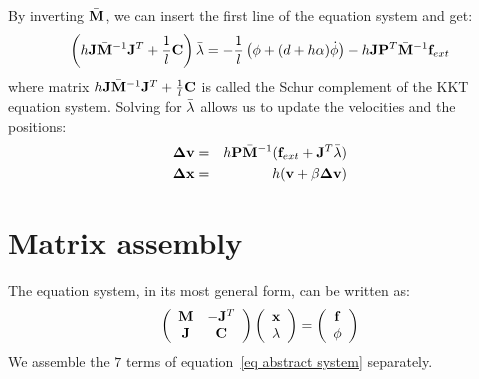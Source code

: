 
By inverting $\bar{\mathbf{M}}$, we can insert the first line of the equation system and get:
\begin{equation} \label{eq schur complement}
 \left( h\mathbf{J}\bar{\mathbf{M}}^{-1}\mathbf{J}^T + \frac{1}{l}\mathbf{C} \right) \bar{\mathbf{\lambda}} = -\frac{1}{l} \left(\phi + (d+h\alpha)\dot {\phi} \right) - h\mathbf{J} \mathbf{P}^T \bar{\mathbf{M}}^{-1} \mathbf{f}_{ext}
\end{equation}
where matrix $ h\mathbf{J}\bar{\mathbf{M}}^{-1}\mathbf{J}^T + \frac{1}{l}\mathbf{C} $ is called the Schur complement of the KKT equation system.
Solving for $\bar{\mathbf{\lambda}}$ allows us to update the velocities and the positions:
\begin{eqnarray}
 \mathbf{\Delta v} &=& h\mathbf{P}\bar{\mathbf{M}}^{-1}(\mathbf{f}_{ext} +\mathbf{J}^T \bar{\mathbf{\lambda}} ) \label{eq update velocities}\\
\mathbf{\Delta x} &=& h( \mathbf{v} + \beta \mathbf{\Delta v} ) \label{eq update positions}
\end{eqnarray}



\section{Matrix assembly} \label{sec matrix assembly}
The equation system, in its most general form, can be written as:
\begin{equation}
 \label{eq abstract system}
 \left( \begin{array}{cc}
\mathbf{M} & -\mathbf{J}^T \\
\mathbf{J} &  \mathbf{C} \end{array}\right)
\left( \begin{array}{c}
\mathbf{x} \\ \mathbf{\lambda}
\end{array}\right) = \left( \begin{array}{c}
\mathbf{f}  \\
\phi
\end{array}\right) 
\end{equation}
We assemble the $7$ terms of equation~\ref{eq abstract system} separately. 

